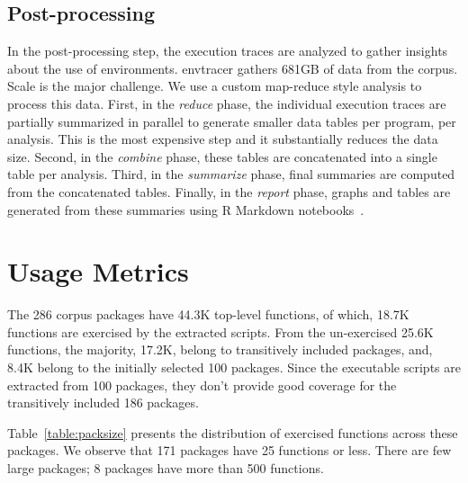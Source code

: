 \documentclass[10pt,review,sigplan,authorversion=true]{acmart}
\newcommand{\envtracer}{{\sf envtracer}\xspace}
\begin{document}
\subsection{Post-processing}
In the post-processing step, the execution traces are analyzed to gather
insights about the use of environments. \envtracer gathers 681GB of data from
the corpus. Scale is the major challenge. We use a custom map-reduce style
analysis to process this data. First, in the \textit{reduce} phase, the
individual execution traces are partially summarized in parallel to generate
smaller data tables per program, per analysis. This is the most expensive step
and it substantially reduces the data size. Second, in the \textit{combine}
phase, these tables are concatenated into a single table per analysis. Third, in
the \textit{summarize} phase, final summaries are computed from the concatenated
tables. Finally, in the \textit{report} phase, graphs and tables are generated
from these summaries using R Markdown notebooks~\cite{rmdpkg}.

\section{Usage Metrics}

The 286 corpus packages have 44.3K top-level functions, of which, 18.7K
functions are exercised by the extracted scripts. From the un-exercised 25.6K
functions, the majority, 17.2K, belong to transitively included packages, and,
8.4K belong to the initially selected 100 packages. Since the executable scripts
are extracted from 100 packages, they don't provide good coverage for the
transitively included 186 packages.

Table~\ref{table:packsize} presents the distribution of exercised functions
across these packages. We observe that 171 packages have 25 functions or less.
There are few large packages; 8 packages have more than 500 functions.
\end{document}
